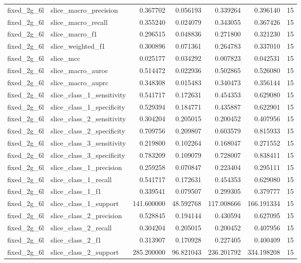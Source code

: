 \begin{tabular}{llrrrrr}
fixed_2g_6l & slice_macro_precision & 0.367702 & 0.056193 & 0.339264 & 0.396140 & 15 \\
fixed_2g_6l & slice_macro_recall & 0.355240 & 0.024079 & 0.343055 & 0.367426 & 15 \\
fixed_2g_6l & slice_macro_f1 & 0.296515 & 0.048836 & 0.271800 & 0.321230 & 15 \\
fixed_2g_6l & slice_weighted_f1 & 0.300896 & 0.071361 & 0.264783 & 0.337010 & 15 \\
fixed_2g_6l & slice_mcc & 0.025177 & 0.034292 & 0.007823 & 0.042531 & 15 \\
fixed_2g_6l & slice_macro_auroc & 0.514472 & 0.022936 & 0.502865 & 0.526080 & 15 \\
fixed_2g_6l & slice_macro_auprc & 0.348308 & 0.015483 & 0.340473 & 0.356144 & 15 \\
fixed_2g_6l & slice_class_1_sensitivity & 0.541717 & 0.172631 & 0.454353 & 0.629080 & 15 \\
fixed_2g_6l & slice_class_1_specificity & 0.529394 & 0.184771 & 0.435887 & 0.622901 & 15 \\
fixed_2g_6l & slice_class_2_sensitivity & 0.304204 & 0.205015 & 0.200452 & 0.407956 & 15 \\
fixed_2g_6l & slice_class_2_specificity & 0.709756 & 0.209807 & 0.603579 & 0.815933 & 15 \\
fixed_2g_6l & slice_class_3_sensitivity & 0.219800 & 0.102264 & 0.168047 & 0.271552 & 15 \\
fixed_2g_6l & slice_class_3_specificity & 0.783209 & 0.109079 & 0.728007 & 0.838411 & 15 \\
fixed_2g_6l & slice_class_1_precision & 0.259258 & 0.070847 & 0.223404 & 0.295111 & 15 \\
fixed_2g_6l & slice_class_1_recall & 0.541717 & 0.172631 & 0.454353 & 0.629080 & 15 \\
fixed_2g_6l & slice_class_1_f1 & 0.339541 & 0.079507 & 0.299305 & 0.379777 & 15 \\
fixed_2g_6l & slice_class_1_support & 141.600000 & 48.592768 & 117.008666 & 166.191334 & 15 \\
fixed_2g_6l & slice_class_2_precision & 0.528845 & 0.194144 & 0.430594 & 0.627095 & 15 \\
fixed_2g_6l & slice_class_2_recall & 0.304204 & 0.205015 & 0.200452 & 0.407956 & 15 \\
fixed_2g_6l & slice_class_2_f1 & 0.313907 & 0.170928 & 0.227405 & 0.400409 & 15 \\
fixed_2g_6l & slice_class_2_support & 285.200000 & 96.821043 & 236.201792 & 334.198208 & 15 \\

\end{tabular}
